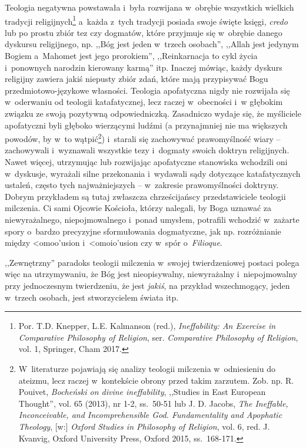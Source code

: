 Teologia negatywna powstawała i~była rozwijana w~obrębie wszystkich wielkich tradycji religijnych\footnote{Por. T.D. Knepper, L.E. Kalmanson (red.), \textit{Ineffability: An Exercise in Comparative Philosophy of Religion}, ser. \textit{Comparative Philosophy of Religion}, vol. 1, Springer, Cham 2017.} a~każda z~tych tradycji posiada swoje święte księgi, \textit{credo} lub po prostu zbiór tez czy dogmatów, które przyjmuje się w~obrębie danego dyskursu religijnego, np. ,,Bóg jest jeden w~trzech osobach'', ,,Allah jest jedynym Bogiem a~Mahomet jest jego prorokiem'', ,,Reinkarnacja to cykl życia i~ponownych narodzin kierowany karmą'' itp. Inaczej mówiąc, każdy dyskurs religijny zawiera jakiś niepusty zbiór zdań, które mają przypisywać Bogu przedmiotowo-językowe własności. Teologia apofatyczna nigdy nie rozwijała się w~oderwaniu od teologii katafatycznej, lecz raczej w~obecności i~w głębokim związku ze swoją pozytywną odpowiedniczką. Zasadniczo wydaje się, że myśliciele apofatyczni byli głęboko wierzącymi ludźmi (a przynajmniej nie ma większych powodów, by w~to wątpić\footnote{W~literaturze pojawiają się analizy teologii milczenia w~odniesieniu do ateizmu, lecz raczej w~kontekście obrony przed takim zarzutem. Zob. np. R. Pouivet, \textit{Bocheński on divine ineffability}, ,,Studies in East European Thought'', vol. 65 (2013), nr 1-2, ss.~50-51 lub J. D. Jacobs, \textit{The Ineffable, Inconceivable, and Incomprehensible God. Fundamentality and Apophatic Theology}, [w:] \textit{Oxford Studies in Philosophy of Religion}, vol. 6, red. J. Kvanvig, Oxford University Press, Oxford 2015, ss.~168-171.}) i~starali się zachowywać prawomyślność wiary -- zachowywali i~wyznawali wszystkie tezy i~dogmaty swoich doktryn religijnych. Nawet więcej, utrzymując lub rozwijając apofatyczne stanowiska wchodzili oni w~dyskusje, wyrażali silne przekonania i~wydawali sądy dotyczące katafatycznych ustaleń, często tych najważniejszych -- w~zakresie prawomyślności doktryny. Dobrym przykładem są tutaj zwłaszcza chrześcijańscy przedstawiciele teologii milczenia. Ci sami Ojcowie Kościoła, którzy nalegali, by Boga uznawać za niewyrażalnego, niepojmowalnego i~ponad umysłem, potrafili wchodzić w~zażarte spory o~bardzo precyzyjne sformułowania dogmatyczne, jak np. rozróżnianie między
\textgreek{<omoo'usion}
i~\textgreek{<omoio'usion}
czy w~spór o~\textit{Filioque}.

,,Zewnętrzny'' paradoks teologii milczenia w~swojej twierdzeniowej postaci polega więc na utrzymywaniu, że Bóg jest nieopisywalny, niewyrażalny i~niepojmowalny przy jednoczesnym twierdzeniu, że jest \textit{jakiś}, na przykład wszechmogący, jeden w~trzech osobach, jest stworzycielem świata itp.


